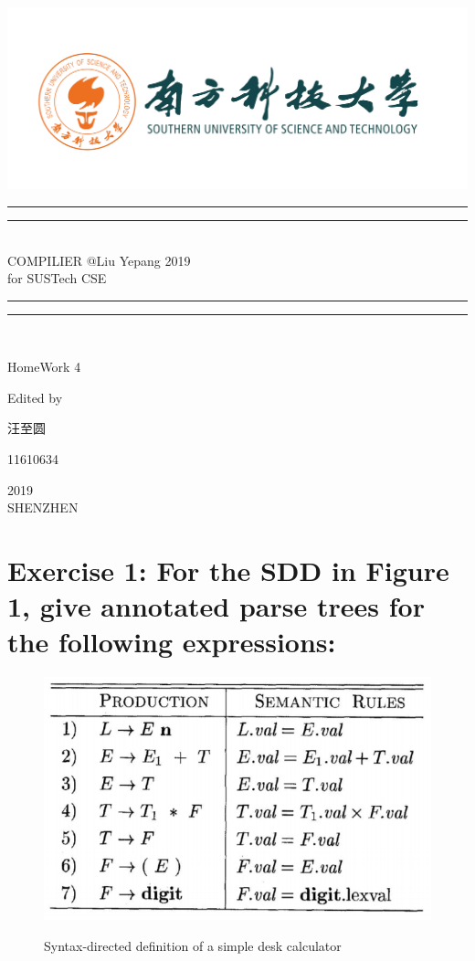 \documentclass{article}
\begin{document}
 
    \begin{titlepage}       %
        \centering
        \includegraphics[width=\textwidth]{../SUSTC_LOGO.png}
        \rule{\textwidth}{1.6pt}\vspace*{-\baselineskip}\vspace*{2pt}
        \rule{\textwidth}{0.4pt}\\[\baselineskip]
        {\LARGE COMPILIER @Liu Yepang 2019\\[\baselineskip]\small for SUSTech CSE}
        \\[0.2\baselineskip]
        \rule{\textwidth}{0.4pt}\vspace*{-\baselineskip}\vspace{3.2pt}
        \rule{\textwidth}{1.6pt}\\[\baselineskip]
        \scshape
        \vspace*{\baselineskip}
        {\Large HomeWork 4\par }
        Edited by \\[\baselineskip] {汪至圆\par}
        {\Large 11610634\par }
        \vfill
        {\scshape 2019} \\{\large SHENZHEN}\par
    \end{titlepage}
    \section{Exercise 1: For the SDD in Figure 1, give annotated parse trees for the following expressions:}
        \begin{figure}[H]
            \centering
            \caption{Syntax-directed definition of a simple desk calculator}
            \includegraphics[scale=0.5]{./Q1_1.png}
            \label{fig:label}
        \end{figure}
\end{document}
